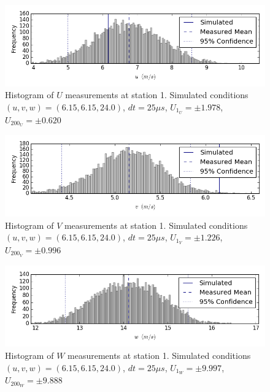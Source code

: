 \begin{figure}[H]
\centering
\includegraphics[width=6in]{figs/Ely_May28th01001/uncertainty_Ely_May28th01001_U}
\caption{Histogram of $U$ measurements at station 1. Simulated conditions $(u,v,w)=(6.15, 6.15, 24.0)$, $dt=25 \mu s$, $U_1_U=\pm 1.978$, $U_200_U=\pm 0.620$}
\label{fig:uncertainty_Ely_May28th01001_U}
\end{figure}


\begin{figure}[H]
\centering
\includegraphics[width=6in]{figs/Ely_May28th01001/uncertainty_Ely_May28th01001_V}
\caption{Histogram of $V$ measurements at station 1. Simulated conditions $(u,v,w)=(6.15, 6.15, 24.0)$, $dt=25 \mu s$, $U_1_V=\pm 1.226$, $U_200_V=\pm 0.996$}
\label{fig:uncertainty_Ely_May28th01001_V}
\end{figure}


\begin{figure}[H]
\centering
\includegraphics[width=6in]{figs/Ely_May28th01001/uncertainty_Ely_May28th01001_W}
\caption{Histogram of $W$ measurements at station 1. Simulated conditions $(u,v,w)=(6.15, 6.15, 24.0)$, $dt=25 \mu s$, $U_1_W=\pm 9.997$, $U_200_W=\pm 9.888$}
\label{fig:uncertainty_Ely_May28th01001_W}
\end{figure}


